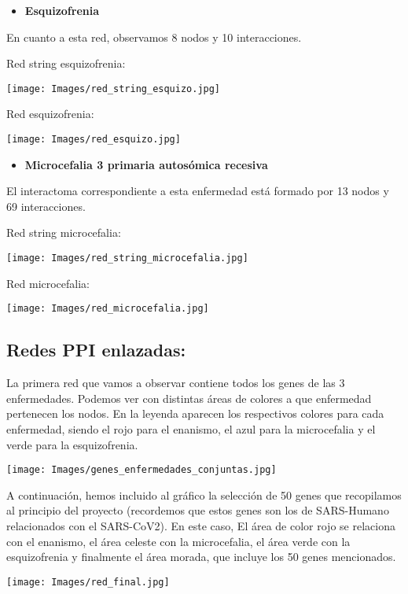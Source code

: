         \begin{itemize}
            \item \textbf{Esquizofrenia}
        \end{itemize}
            En cuanto a esta red, observamos 8 nodos y 10 interacciones.
        
        Red string esquizofrenia:
        
        \texttt{[image: Images/red\_string\_esquizo.jpg]}
        
        Red esquizofrenia:
        
        \texttt{[image: Images/red\_esquizo.jpg]}
            
        \begin{itemize}
            \item \textbf{Microcefalia 3 primaria autosómica recesiva}
        \end{itemize}
            El interactoma correspondiente a esta enfermedad está formado por 13 nodos y 69 interacciones.
            
        Red string microcefalia:
        
        \texttt{[image: Images/red\_string\_microcefalia.jpg]}
        
        Red microcefalia:
        
        \texttt{[image: Images/red\_microcefalia.jpg]}   
        
    \subsection{Redes PPI enlazadas:}
    
        La primera red que vamos a observar contiene todos los genes de las 3 enfermedades. Podemos ver con distintas áreas de colores a que enfermedad pertenecen los nodos. En la leyenda aparecen los respectivos colores para cada enfermedad, siendo el rojo para el enanismo, el azul para la microcefalia y el verde para la esquizofrenia.
        
        \texttt{[image: Images/genes\_enfermedades\_conjuntas.jpg]} 
        
        A continuación, hemos incluido al gráfico la selección de 50 genes que recopilamos al principio del proyecto (recordemos que estos genes son los de SARS-Humano relacionados con el SARS-CoV2). En este caso, El área de color rojo se relaciona con el enanismo, el área celeste con la microcefalia, el área verde con la esquizofrenia y finalmente el área morada, que incluye los 50 genes mencionados.
        
        \texttt{[image: Images/red\_final.jpg]} 
        
        
        
        
       